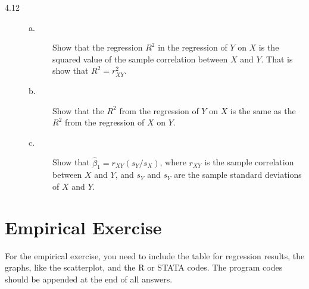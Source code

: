 \documentclass[a4paper,11pt]{article}
\begin{document}
\vspace{0.5cm}

\begin{description}
\item[{4.12}] \begin{description}
\item[{a.}] Show that the regression \(R^2\) in the regression of \(Y\) on
\(X\) is the squared value of the sample correlation between
\(X\) and \(Y\). That is show that \(R^2 = r^2_{XY}\).
\item[{b.}] Show that the \(R^2\) from the regression of \(Y\) on \(X\) is the
same as the \(R^2\) from the regression of \(X\) on \(Y\).
\item[{c.}] Show that \(\hat{\beta}_1 = r_{XY}(s_Y/s_X)\), where \(r_{XY}\)
is the sample correlation between \(X\) and \(Y\), and \(s_Y\) and
\(s_Y\) are the sample standard deviations of \(X\) and \(Y\).
\end{description}
\end{description}

\section*{Empirical Exercise}
\label{sec:org2c1f4fb}

For the empirical exercise, you need to include the table for
regression results, the graphs, like the scatterplot, and the R or
STATA codes. The program codes should be appended at the end of all
answers.
\end{document}
